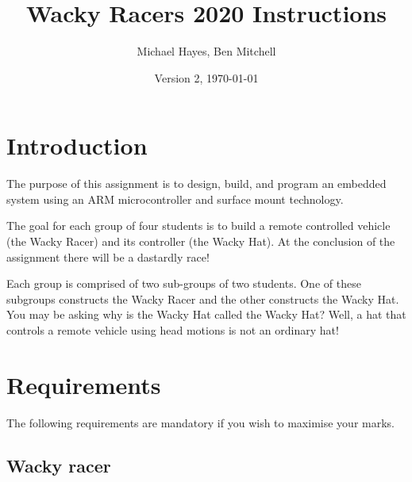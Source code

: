 \documentclass[11pt, a4paper]{article}
\title{Wacky Racers 2020 Instructions}
\author{Michael Hayes, Ben Mitchell}
\date{Version 2, \today}
\begin{document}
\maketitle

\section{Introduction}

The purpose of this assignment is to design, build, and program an
embedded system using an ARM microcontroller and surface mount
technology.

The goal for each group of four students is to build a remote
controlled vehicle (the Wacky Racer) and its controller (the Wacky
Hat).  At the conclusion of the assignment there will be a dastardly race!

Each group is comprised of two sub-groups of two students.  One of
these subgroups constructs the Wacky Racer and the other constructs
the Wacky Hat.  You may be asking why is the Wacky Hat called the
Wacky Hat?  Well, a hat that controls a remote vehicle using head
motions is not an ordinary hat!


\section{Requirements}

The following requirements are mandatory if you wish to maximise your
marks.


\subsection{Wacky racer}
\end{document}
